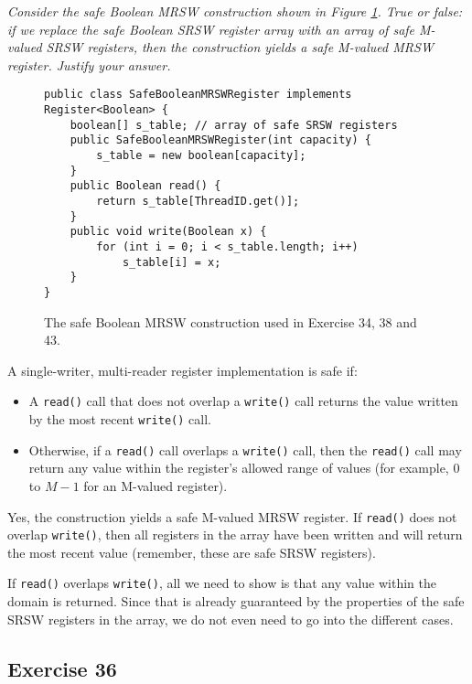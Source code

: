 \documentclass[a4paper,10pt]{article}
\begin{document}
\emph{Consider the safe Boolean MRSW construction shown in Figure \ref{fig:safebooleanmrsw}.
True or false: if we replace the safe Boolean SRSW register array with an array
of safe M-valued SRSW registers, then the construction yields a safe M-valued
MRSW register. Justify your answer.}

\vspace{3mm}

\begin{figure}
\begin{lstlisting}
public class SafeBooleanMRSWRegister implements Register<Boolean> {
    boolean[] s_table; // array of safe SRSW registers
    public SafeBooleanMRSWRegister(int capacity) {
        s_table = new boolean[capacity];
    }
    public Boolean read() {
        return s_table[ThreadID.get()];
    }
    public void write(Boolean x) {
        for (int i = 0; i < s_table.length; i++)
            s_table[i] = x;
    }
}
\end{lstlisting}
\caption{The safe Boolean MRSW construction used in Exercise 34, 38 and 43.}
\label{fig:safebooleanmrsw}
\end{figure}

A single-writer, multi-reader register implementation is safe if: 

\begin{itemize}
\item A \lstinline|read()| call that does not overlap a \lstinline|write()| call returns the value written by
      the most recent \lstinline|write()| call.
\item Otherwise, if a \lstinline|read()| call overlaps a \lstinline|write()| call, then the \lstinline|read()| call may
      return any value within the register’s allowed range of values (for example,
      $0$ to $M - 1$ for an M-valued register).
\end{itemize}

Yes, the construction yields a safe M-valued MRSW register. If \lstinline|read()|
does not overlap \lstinline|write()|, then all registers in the array have been written
and will return the most recent value (remember, these are safe SRSW registers).

If \lstinline|read()| overlaps \lstinline|write()|, all we need to show is that
any value within the domain is returned. Since that is already guaranteed
by the properties of the safe SRSW registers in the array, we do not even need
to go into the different cases.


\subsection{Exercise 36}
\end{document}
